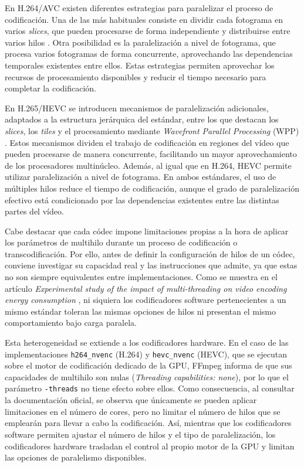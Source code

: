   En H.264/AVC existen diferentes estrategias para paralelizar el proceso de codificación. Una de las más habituales consiste en dividir cada fotograma en varios \textit{slices}, que pueden procesarse de forma independiente y distribuirse entre varios hilos \cite{chen2004multilevel}. Otra posibilidad es la paralelización a nivel de fotograma, que procesa varios fotogramas de forma concurrente, aprovechando las dependencias temporales existentes entre ellos. Estas estrategias permiten aprovechar los recursos de procesamiento disponibles y reducir el tiempo necesario para completar la codificación.
  
  En H.265/HEVC se introducen mecanismos de paralelización adicionales, adaptados a la estructura jerárquica del estándar, entre los que destacan los \textit{slices}, los \textit{tiles} y el procesamiento mediante \textit{Wavefront Parallel Processing} (WPP) \cite{radicke2014multithreaded}. Estos mecanismos dividen el trabajo de codificación en regiones del vídeo que pueden procesarse de manera concurrente, facilitando un mayor aprovechamiento de los procesadores multinúcleo. Además, al igual que en H.264, HEVC permite utilizar paralelización a nivel de fotograma. En ambos estándares, el uso de múltiples hilos reduce el tiempo de codificación, aunque el grado de paralelización efectivo está condicionado por las dependencias existentes entre las distintas partes del vídeo.
  
  Cabe destacar que cada códec impone limitaciones propias a la hora de aplicar los parámetros de multihilo durante un proceso de codificación o transcodificación. Por ello, antes de definir la configuración de hilos de un códec, conviene investigar su capacidad real y las instrucciones que admite, ya que estas no son siempre equivalentes entre implementaciones. Como se muestra en el artículo \textit{Experimental study of the impact of multi-threading on video encoding energy consumption} \cite{multithread-energy-consumption-videoencoding}, ni siquiera los codificadores software pertenecientes a un mismo estándar toleran las mismas opciones de hilos ni presentan el mismo comportamiento bajo carga paralela.
  
  Esta heterogeneidad se extiende a los codificadores hardware. En el caso de las implementaciones \texttt{h264\_nvenc} (H.264) y \texttt{hevc\_nvenc} (HEVC), que se ejecutan sobre el motor de codificación dedicado de la GPU, FFmpeg informa de que sus capacidades de multihilo son nulas (\textit{Threading capabilities: none}), por lo que el parámetro \texttt{-threads} no tiene efecto sobre ellos. Como consecuencia, al consultar la documentación oficial, se observa que únicamente se pueden aplicar limitaciones en el número de cores, pero no limitar el número de hilos que se emplearán para llevar a cabo la codificación. Así, mientras que los codificadores software permiten ajustar el número de hilos y el tipo de paralelización, los codificadores hardware trasladan el control al propio motor de la GPU y limitan las opciones de paralelismo disponibles.
  
